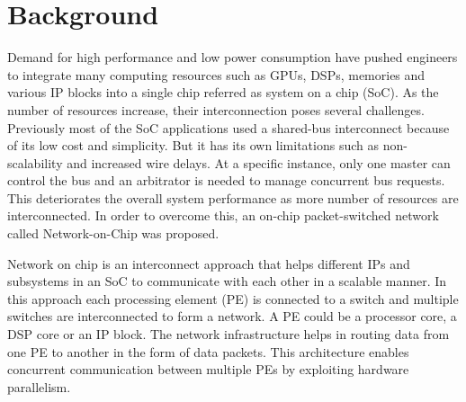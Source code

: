 \section{Background}
\label{sec_background}

Demand for high performance and low power consumption have pushed engineers to integrate many computing resources such as GPUs, DSPs, memories and various IP blocks into a single chip referred as system on a chip (SoC). 
As the number of resources increase, their interconnection poses several challenges. 
Previously most of the SoC applications used a shared-bus interconnect because of its low cost and simplicity.
But it has its own limitations such as non-scalability and increased wire delays. 
At a specific instance, only one master can control the bus and an arbitrator is needed to manage concurrent bus requests.
This deteriorates the overall system performance as more number of resources are interconnected. In order to overcome this, an on-chip packet-switched network called Network-on-Chip was proposed.

Network on chip is an interconnect approach that helps different IPs and subsystems in an SoC to communicate with each other in a scalable manner. 
In this approach each processing element (PE) is connected to a switch and multiple switches are interconnected to form a network.
A PE could be a processor core, a DSP core or an IP block.
The network infrastructure helps in routing data from one PE to another in the form of data packets. 
This architecture enables concurrent communication between multiple PEs by exploiting hardware parallelism.

